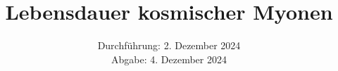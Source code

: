 

\subject{\texorpdfstring{\vspace{2ex}}{}V01\texorpdfstring{\vspace{-2ex}}{}} %
\title{Lebensdauer kosmischer Myonen} %
\date{
	Durchführung: 2. Dezember 2024 %
	\\ Abgabe: 4. Dezember 2024 %
}





\maketitle
\thispagestyle{empty}

\tableofcontents
\newpage








\printbibliography{}

\newpage




